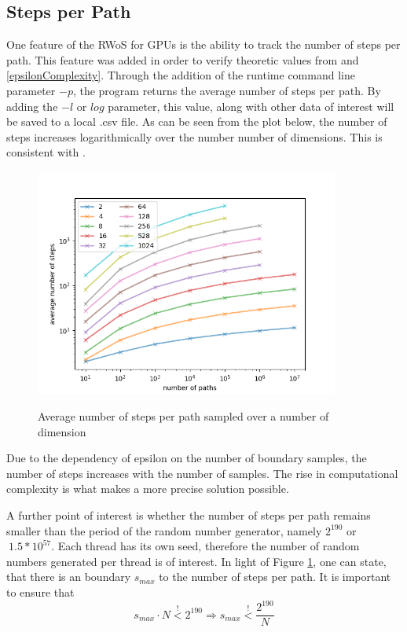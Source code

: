\subsection{Steps per Path}
One feature of the \Gls{RWoS} for \Glspl{GPU} is the ability to track the number of
steps per path.  This feature was added in order to verify theoretic values from \cite{Bornemann,DeLaurentis} and
\ref{epsilonComplexity}.  Through the addition of the runtime command line parameter
$-p$, the program returns the average number of steps per path.  By adding the $-l$
or  \textendash$log$
parameter, this value, along with other data of interest will be saved to a local
.csv file.  As can be seen from the plot below, the number of steps increases
logarithmically over the number number of dimensions.  This is consistent with \cite{Bornemann, DeLaurentis}.
\begin{figure}
\begin{center}
\includegraphics[width=10.0cm]{styles/paths_per_dim} \label{plot:pathsPerDim}
  \caption{Average number of steps per path sampled over a number of dimension}
\end{center}
\end{figure}
Due to the dependency of epsilon on the number of boundary samples, the number of steps
increases with the number of samples.  The rise in computational complexity is what
makes a more precise solution possible.
\par
A further point of interest is whether the number of steps per path remains smaller
than the period of the random number generator, namely $2^{190}$ or $~1.5 * 10^{57}$.
Each thread has its own seed, therefore the number of random numbers generated per
thread is of interest. In light of Figure \ref{plot:pathsPerDim}, one can state,
that there is an boundary $s_{max}$ to the number of steps per path. It is important to
ensure that
\begin{equation}
  s_{max} \cdot N \overset{!}{<} 2^{190}
  \Rightarrow s_{max} \overset{!}{<} \frac{2^{190}}{N}
\end{equation}

